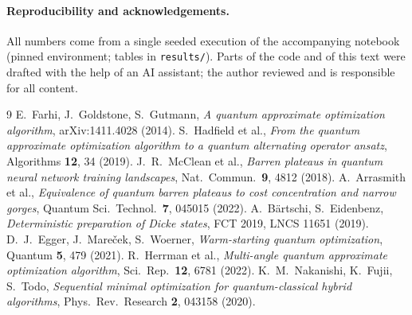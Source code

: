 \documentclass[11pt,a4paper]{article}
\begin{document}
\paragraph{Reproducibility and acknowledgements.} All numbers come from a single seeded
execution of the accompanying notebook (pinned environment; tables in \texttt{results/}).
Parts of the code and of this text were drafted with the help of an AI assistant; the author
reviewed and is responsible for all content.

\begin{thebibliography}{9}\small\setlength\itemsep{0pt}
 E.~Farhi, J.~Goldstone, S.~Gutmann, \emph{A quantum approximate optimization algorithm}, arXiv:1411.4028 (2014).
 S.~Hadfield et al., \emph{From the quantum approximate optimization algorithm to a quantum alternating operator ansatz}, Algorithms \textbf{12}, 34 (2019).
 J.~R.~McClean et al., \emph{Barren plateaus in quantum neural network training landscapes}, Nat.\ Commun.\ \textbf{9}, 4812 (2018).
 A.~Arrasmith et al., \emph{Equivalence of quantum barren plateaus to cost concentration and narrow gorges}, Quantum Sci.\ Technol.\ \textbf{7}, 045015 (2022).
 A.~B\"artschi, S.~Eidenbenz, \emph{Deterministic preparation of Dicke states}, FCT 2019, LNCS 11651 (2019).
 D.~J.~Egger, J.~Mare\v{c}ek, S.~Woerner, \emph{Warm-starting quantum optimization}, Quantum \textbf{5}, 479 (2021).
 R.~Herrman et al., \emph{Multi-angle quantum approximate optimization algorithm}, Sci.\ Rep.\ \textbf{12}, 6781 (2022).
 K.~M.~Nakanishi, K.~Fujii, S.~Todo, \emph{Sequential minimal optimization for quantum-classical hybrid algorithms}, Phys.\ Rev.\ Research \textbf{2}, 043158 (2020).
\end{thebibliography}
\end{document}
